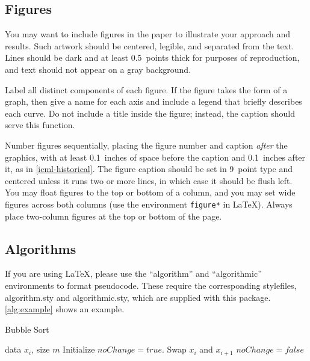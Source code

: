 \documentclass{article}
\theoremstyle{plain}
\theoremstyle{definition}
\theoremstyle{remark}
\begin{document}
    \subsection{Figures}
    
    You may want to include figures in the paper to illustrate
    your approach and results. Such artwork should be centered,
    legible, and separated from the text. Lines should be dark and at
    least 0.5~points thick for purposes of reproduction, and text should
    not appear on a gray background.
    
    Label all distinct components of each figure. If the figure takes the
    form of a graph, then give a name for each axis and include a legend
    that briefly describes each curve. Do not include a title inside the
    figure; instead, the caption should serve this function.
    
    Number figures sequentially, placing the figure number and caption
    \emph{after} the graphics, with at least 0.1~inches of space before
    the caption and 0.1~inches after it, as in
    \cref{icml-historical}. The figure caption should be set in
    9~point type and centered unless it runs two or more lines, in which
    case it should be flush left. You may float figures to the top or
    bottom of a column, and you may set wide figures across both columns
    (use the environment \texttt{figure*} in \LaTeX). Always place
    two-column figures at the top or bottom of the page.
    
    \subsection{Algorithms}
    
    If you are using \LaTeX, please use the ``algorithm'' and ``algorithmic''
    environments to format pseudocode. These require
    the corresponding stylefiles, algorithm.sty and
    algorithmic.sty, which are supplied with this package.
    \cref{alg:example} shows an example.
    
    \begin{algorithm}[tb]
       \caption{Bubble Sort}
       \label{alg:example}
    \begin{algorithmic}
        data $x_i$, size $m$
       \REPEAT
       \STATE Initialize $noChange = true$.
       \STATE Swap $x_i$ and $x_{i+1}$
       \STATE $noChange = false$
       \ENDIF
       \ENDFOR
    \end{algorithmic}
    \end{algorithm}
    
\end{document}

